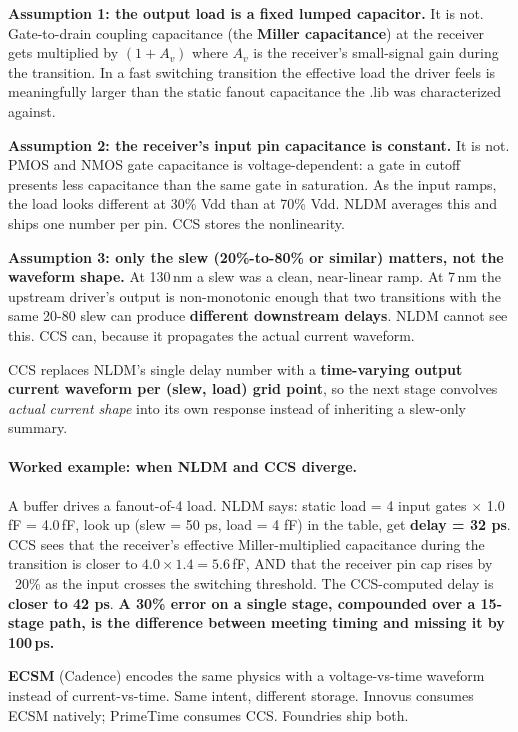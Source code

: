 \textbf{Assumption 1: the output load is a fixed lumped capacitor.} It is not. Gate-to-drain coupling capacitance (the \textbf{Miller capacitance}) at the receiver gets multiplied by $(1 + A_v)$ where $A_v$ is the receiver's small-signal gain during the transition. In a fast switching transition the effective load the driver feels is meaningfully larger than the static fanout capacitance the .lib was characterized against.

\textbf{Assumption 2: the receiver's input pin capacitance is constant.} It is not. PMOS and NMOS gate capacitance is voltage-dependent: a gate in cutoff presents less capacitance than the same gate in saturation. As the input ramps, the load looks different at 30\% Vdd than at 70\% Vdd. NLDM averages this and ships one number per pin. CCS stores the nonlinearity.

\textbf{Assumption 3: only the slew (20\%-to-80\% or similar) matters, not the waveform shape.} At 130\,nm a slew was a clean, near-linear ramp. At 7\,nm the upstream driver's output is non-monotonic enough that two transitions with the same 20-80 slew can produce \textbf{different downstream delays}. NLDM cannot see this. CCS can, because it propagates the actual current waveform.

\begin{keyidea}
CCS replaces NLDM's single delay number with a \textbf{time-varying output current waveform per (slew, load) grid point}, so the next stage convolves \emph{actual current shape} into its own response instead of inheriting a slew-only summary.
\end{keyidea}

\paragraph{Worked example: when NLDM and CCS diverge.} A buffer drives a fanout-of-4 load. NLDM says: static load = 4 input gates $\times$ 1.0\,fF = 4.0\,fF, look up (slew = 50 ps, load = 4 fF) in the table, get \textbf{delay = 32 ps}. CCS sees that the receiver's effective Miller-multiplied capacitance during the transition is closer to $4.0 \times 1.4 = 5.6$\,fF, AND that the receiver pin cap rises by ~20\% as the input crosses the switching threshold. The CCS-computed delay is \textbf{closer to 42 ps}. \textbf{A 30\% error on a single stage, compounded over a 15-stage path, is the difference between meeting timing and missing it by 100\,ps.}

\textbf{ECSM} (Cadence) encodes the same physics with a voltage-vs-time waveform instead of current-vs-time. Same intent, different storage. Innovus consumes ECSM natively; PrimeTime consumes CCS. Foundries ship both.


